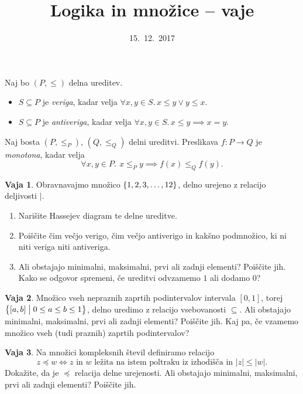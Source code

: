 \documentclass{article}
\newcommand{\all}[1]{\forall #1 .\,}
\theoremstyle{definition}
\newtheorem{vaja}{Vaja}
\begin{document}
\title{Logika in množice -- vaje}
\date{15.~12.~2017}
\maketitle

\bigskip

\noindent
Naj bo $(P, \leq)$ delna ureditev.
\begin{itemize}
  \item
    $S \subseteq P$ je \emph{veriga}, kadar velja $\all{x, y \in S}{x \leq y \lor y \leq x}$.
  \item
    $S \subseteq P$ je \emph{antiveriga}, kadar velja $\all{x, y \in S}{x \leq y \implies x = y}$.
\end{itemize}

\bigskip

\noindent
Naj bosta $(P, \leq_P)$, $(Q, \leq_Q)$ delni ureditvi. Preslikava $f\colon P \to Q$ je \emph{monotona}, kadar velja
\begin{equation*}
  \all{x, y \in P}{\ x \leq_P y \implies f(x) \leq_Q f(y)}.
\end{equation*}

\bigskip

\begin{vaja}
  Obravnavajmo množico $\set{1, 2, 3, \ldots, 12}$, delno urejeno z relacijo deljivosti $|$.
  \begin{enumerate}
    \item
      Narišite Hassejev diagram te delne ureditve.
    \item
      Poiščite čim večjo verigo, čim večjo antiverigo in kakšno podmnožico, ki ni niti veriga niti antiveriga.
    \item
      Ali obstajajo minimalni, maksimalni, prvi ali zadnji elementi? Poiščite jih. Kako se odgovor spremeni, če ureditvi odvzamemo $1$ ali dodamo $0$?
  \end{enumerate}
\end{vaja}

\begin{vaja}
  Množico vseh nepraznih zaprtih podintervalov intervala $[0, 1]$, torej $\set[1]{[a, b]}{0 \leq a \leq b \leq 1}$, delno uredimo z relacijo vsebovanosti $\subseteq$. Ali obstajajo minimalni, maksimalni, prvi ali zadnji elementi? Poiščite jih. Kaj pa, če vzamemo množico vseh (tudi praznih) zaprtih podintervalov?
\end{vaja}

\begin{vaja}
  Na množici kompleksnih števil definiramo relacijo
  \begin{equation*}
    z \preccurlyeq w \iff \text{$z$ in $w$ ležita na istem poltraku iz izhodišča in $|z| \leq |w|$}.
  \end{equation*}
  Dokažite, da je $\preccurlyeq$ relacija delne urejenosti. Ali obstajajo minimalni, maksimalni, prvi ali zadnji elementi? Poiščite jih.
\end{vaja}
\end{document}
